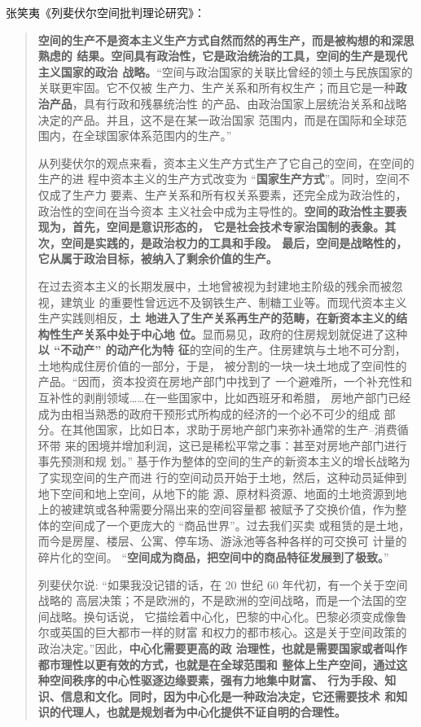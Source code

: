 张笑夷《列斐伏尔空间批判理论研究》\cite{zhangxiaoyi}：
\begin{quotation}
  \textbf{空间的生产不是资本主义生产方式自然而然的再生产，而是被构想的和深思熟虑的
    结果。空间具有政治性，它是政治统治的工具，空间的生产是现代主义国家的政治
    战略。}“空间与政治国家的关联比曾经的领土与民族国家的关联更牢固。它不仅被
  生产力、生产关系和所有权生产；而且它是一种\textbf{政治产品}，具有行政和残暴统治性
  的产品、由政治国家上层统治关系和战略决定的产品。并且，这不是在某一政治国家
  范围内，而是在国际和全球范围内，在全球国家体系范围内的生产。”

  从列斐伏尔的观点来看，资本主义生产方式生产了它自己的空间，在空间的生产的进
  程中资本主义的生产方式改变为 “\textbf{国家生产方式}”。同时，空间不仅成了生产力
  要素、生产关系和所有权关系要素，还完全成为政治性的，政治性的空间在当今资本
  主义社会中成为主导性的。\textbf{空间的政治性主要表现为，首先，空间是意识形态的，
    它是社会技术专家治国制的表象。其次，空间是实践的，是政治权力的工具和手段。
    最后，空间是战略性的，它从属于政治目标，被纳入了剩余价值的生产。}

  在过去资本主义的长期发展中，土地曾被视为封建地主阶级的残余而被忽视，建筑业
  的重要性曾远远不及钢铁生产、制糖工业等。而现代资本主义生产实践则相反，\textbf{土
    地进入了生产关系再生产的范畴，在新资本主义的结构性生产关系中处于中心地
    位。}显而易见，政府的住房规划就促进了这种\textbf{以 “不动产” 的动产化为特
    征}的空间的生产。住房建筑与土地不可分割，土地构成住房价值的一部分，于是，
  被分割的一块一块土地成了空间性的产品。“因而，资本投资在房地产部门中找到了
  一个避难所，一个补充性和互补性的剥削领域……在一些国家中，比如西班牙和希腊，
  房地产部门已经成为由相当熟悉的政府干预形式所构成的经济的一个必不可少的组成
  部分。在其他国家，比如日本，求助于房地产部门来弥补通常的生产--消费循环带
  来的困境并增加利润，这已是稀松平常之事：甚至对房地产部门进行事先预测和规
  划。” 基于作为整体的空间的生产的新资本主义的增长战略为了实现空间的生产而进
  行的空间动员开始于土地，然后，这种动员延伸到地下空间和地上空间，从地下的能
  源、原材料资源、地面的土地资源到地上的被建筑或各种需要分隔出来的空间容量都
  被赋予了交换价值，作为整体的空间成了一个更庞大的 “商品世界”。过去我们买卖
  或租赁的是土地，而今是房屋、楼层、公寓、停车场、游泳池等各种各样的可交换可
  计量的碎片化的空间。 “\textbf{空间成为商品，把空间中的商品特征发展到了极致。}”

  列斐伏尔说: “如果我没记错的话，在 20 世纪 60 年代初，有一个关于空间战略的
  高层决策；不是欧洲的，不是欧洲的空间战略，而是一个法国的空间战略。换句话说，
  它描绘着中心化，巴黎的中心化。巴黎必须变成像鲁尔或英国的巨大都市一样的财富
  和权力的都市核心。这是关于空间政策的政治决定。”因此，\textbf{中心化需要更高的政
    治理性，也就是需要国家或者叫作都市理性以更有效的方式，也就是在全球范围和
    整体上生产空间，通过这种空间秩序的中心性驱逐边缘要素，强有力地集中财富、
    行为手段、知识、信息和文化。同时，因为中心化是一种政治决定，它还需要技术
    和知识的代理人，也就是规划者为中心化提供不证自明的合理性。}


\end{quotation}

